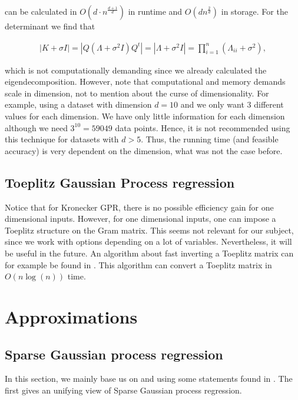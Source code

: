 \documentclass[12pt,a4paper,oneside]{book}
\begin{document}
can be calculated in $O\left(d \cdot n^{\frac{d+1}{d}} \right)$ in runtime and $O(d n^{\frac{2}{d}})$ in storage. For the determinant we find that 

\begin{align}
| K + \sigma I | = |Q ( \Lambda + \sigma^2 I) Q^t| =  |\Lambda + \sigma^2 I | = \prod_{i=1}^n (\Lambda_{ii} + \sigma^2),
\end{align}

which is not computationally demanding since we already calculated the eigendecomposition. However, note that computational and memory demands scale in dimension, not to mention about the curse of dimensionality. For example, using a dataset with dimension $d =10$ and we only want $3$ different values for each dimension. We have only little information for each dimension although we need $3^{10} = 59049$ data points. Hence, it is not recommended using this technique for datasets with $d > 5$.  Thus, the running time (and feasible accuracy) is very dependent on the dimension, what was not the case before.  


\section{Toeplitz Gaussian Process regression}

Notice that for Kronecker GPR, there is no possible efficiency gain for one dimensional inputs. However, for one dimensional inputs, one can impose a Toeplitz structure on the Gram matrix. This seems not relevant for our subject, since we work with options depending on a lot of variables. Nevertheless, it will be useful in the future. An algorithm about fast inverting a Toeplitz matrix can for example be found in \cite{chan1994circulant}. This algorithm can convert a Toeplitz matrix in $O(n \log{ (n)})$ time.


\chapter{Approximations}

\section{Sparse Gaussian process regression}


In this section, we mainly base us on \cite{quinonero2005unifying} and  \cite{snelson2006sparse} using some statements found in \cite{GPRbook}. The first gives an unifying view of Sparse Gaussian process regression.
\end{document}
